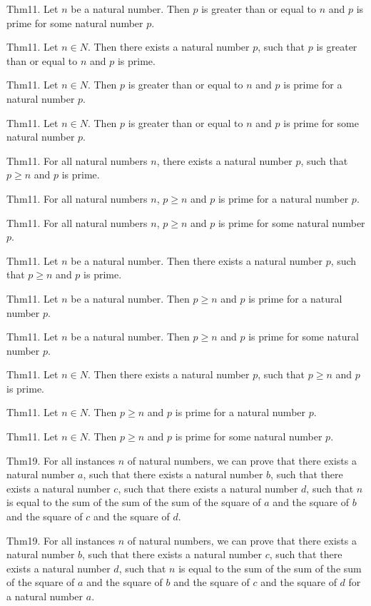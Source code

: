 \documentclass{article}
\begin{document}
Thm11. Let $n$ be a natural number. Then $p$ is greater than or equal to $n$ and $p$ is prime for some natural number $p$.

Thm11. Let $n \in N$. Then there exists a natural number $p$, such that $p$ is greater than or equal to $n$ and $p$ is prime.

Thm11. Let $n \in N$. Then $p$ is greater than or equal to $n$ and $p$ is prime for a natural number $p$.

Thm11. Let $n \in N$. Then $p$ is greater than or equal to $n$ and $p$ is prime for some natural number $p$.

Thm11. For all natural numbers $n$, there exists a natural number $p$, such that $p \geq n$ and $p$ is prime.

Thm11. For all natural numbers $n$, $p \geq n$ and $p$ is prime for a natural number $p$.

Thm11. For all natural numbers $n$, $p \geq n$ and $p$ is prime for some natural number $p$.

Thm11. Let $n$ be a natural number. Then there exists a natural number $p$, such that $p \geq n$ and $p$ is prime.

Thm11. Let $n$ be a natural number. Then $p \geq n$ and $p$ is prime for a natural number $p$.

Thm11. Let $n$ be a natural number. Then $p \geq n$ and $p$ is prime for some natural number $p$.

Thm11. Let $n \in N$. Then there exists a natural number $p$, such that $p \geq n$ and $p$ is prime.

Thm11. Let $n \in N$. Then $p \geq n$ and $p$ is prime for a natural number $p$.

Thm11. Let $n \in N$. Then $p \geq n$ and $p$ is prime for some natural number $p$.

Thm19. For all instances $n$ of natural numbers, we can prove that there exists a natural number $a$, such that there exists a natural number $b$, such that there exists a natural number $c$, such that there exists a natural number $d$, such that $n$ is equal to the sum of the sum of the sum of the square of $a$ and the square of $b$ and the square of $c$ and the square of $d$.

Thm19. For all instances $n$ of natural numbers, we can prove that there exists a natural number $b$, such that there exists a natural number $c$, such that there exists a natural number $d$, such that $n$ is equal to the sum of the sum of the sum of the square of $a$ and the square of $b$ and the square of $c$ and the square of $d$ for a natural number $a$.
\end{document}
